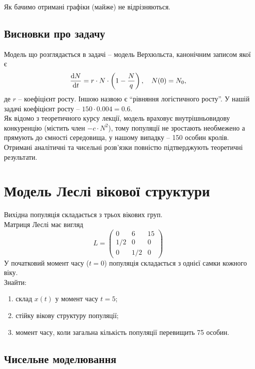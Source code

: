Як бачимо отримані графіки (майже) не відрізняються.

\subsection{Висновки про задачу}

Модель що розглядається в задачі -- модель Верхюльста, канонічним записом якої є 
\begin{equation*}
    \frac{\mathop{}\!\mathrm{d} N}{\mathop{}\!\mathrm{d} t} = r \cdot N \cdot \left( 1 - \frac{N}{q} \right), \quad N(0) = N_0,
\end{equation*}
де $r$ -- коефіцієнт росту. Іншою назвою є ``рівняння логістичного росту''. У нашій задачі коефіцієнт росту -- $150 \cdot 0.004 = 0.6$. \\

Як відомо з теоретичного курсу лекції, модель враховує внутрішньовидову конкуренцію (містить член $-c \cdot N^2$), тому популяції не зростають необмежено а прямують до ємності середовища, у нашому випадку -- 150 особин кролів. \\

Отримані аналітичні та чисельні розв'язки повністю підтверджують теоретичні результати.

\section{Модель Леслі вікової структури}

Вихідна популяція складається з трьох вікових груп. \\

Матриця Леслі має вигляд \[ L = \begin{pmatrix} 0 & 6 & 15 \\ 1/2 & 0 & 0 \\ 0 & 1/2 & 0 \end{pmatrix} \] У початковий момент часу ($t = 0$) популяція складається з однієї самки кожного віку. \\

Знайти:
\begin{enumerate}
	\item склад $x(t)$ у момент часу $t = 5$;
	\item стійку вікову структуру популяції;
	\item момент часу, коли загальна кількість популяції перевищить 75 особин.
\end{enumerate}

\subsection{Чисельне моделювання}

